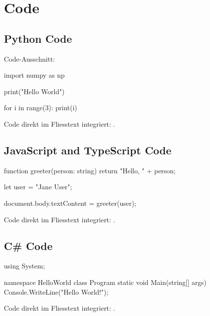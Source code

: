 
\section{Code}

\subsection{Python Code}

Code-Ausschnitt:

\begin{python}
import numpy as np

print("Hello World")

for i in range(3):
	print(i)
\end{python}

Code direkt im Fliesstext integriert: .

\subsection{JavaScript and TypeScript Code}

\begin{javascript}
function greeter(person: string) {
	return "Hello, " + person;
} 

let user = "Jane User";

document.body.textContent = greeter(user);
\end{javascript}

Code direkt im Fliesstext integriert: .


\subsection{C\# Code}

\begin{csharp}
using System;

namespace HelloWorld
{
  class Program
  {
    static void Main(string[] args)
    {
      Console.WriteLine("Hello World!");    
    }
  }
}
\end{csharp}

Code direkt im Fliesstext integriert: .